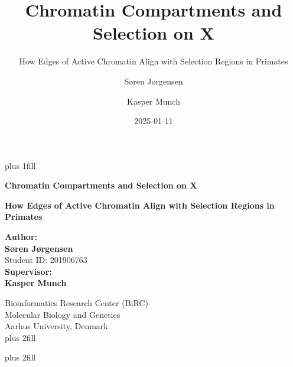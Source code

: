 \documentclass[
  11pt,
  a4paper,
]{scrbook}
\title{Chromatin Compartments and Selection on X}
\subtitle{How Edges of Active Chromatin Align with Selection Regions in
Primates}
\author{Søren Jørgensen \and Kasper Munch}
\date{2025-01-11}
\begin{document}
\frontmatter
\cleardoublepage
\thispagestyle{empty}
{\centering
\hbox{}\vskip 0cm plus 1fill

{%
\Huge\bfseries Chromatin Compartments and Selection on X \par}
\vspace{3ex}
{\Large\bfseries How Edges of Active Chromatin Align with Selection
Regions in Primates \par}
\vspace{5ex}

        {\bfseries Author: \\ \vspace{0.5ex}}
        {\bfseries\Large Søren Jørgensen \\ \vspace{0.7ex}}
            {\large Student ID: 201906763 \\ \vspace{1.2ex} }
        {\bfseries Supervisor: \\ \vspace{0.5ex}}
        {\bfseries\Large Kasper Munch \\ \vspace{0.7ex}}
        \par \vspace{0.7ex}
        {\large Bioinformatics Research Center (BiRC) \\ \vspace{0.7ex}}
        {\large Molecular Biology and Genetics \\ \vspace{0.7ex}}
        {\large Aarhus University, Denmark \\ \vspace{2ex}}
%
\vskip 0cm plus 2fill

{ \par}
\vskip 0cm plus 2fill

}
\end{document}
